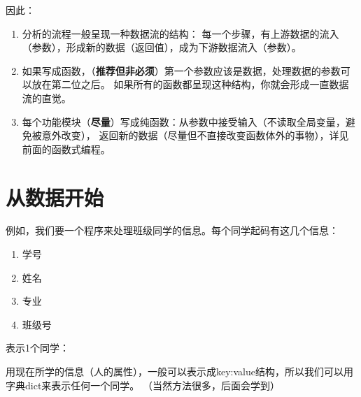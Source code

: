 \documentclass[
  letterpaper,
  DIV=11,
  numbers=noendperiod]{scrreprt}
\providecommand{\tightlist}{%
  \setlength{\itemsep}{0pt}\setlength{\parskip}{0pt}}\usepackage{longtable,booktabs,array}
\begin{document}
因此：

\begin{enumerate}
\def\labelenumi{\arabic{enumi}.}
\tightlist
\item
  分析的流程一般呈现一种数据流的结构：
  每一个步骤，有上游数据的流入（参数），形成新的数据（返回值），成为下游数据流入（参数）。
\item
  如果写成函数，（\textbf{推荐但非必须}）第一个参数应该是数据，处理数据的参数可以放在第二位之后。
  如果所有的函数都呈现这种结构，你就会形成一直数据流的直觉。
\item
  每个功能模块（\textbf{尽量}）写成纯函数：从参数中接受输入（不读取全局变量，避免被意外改变），
  返回新的数据（尽量但不直接改变函数体外的事物），详见前面的函数式编程。
\end{enumerate}

\hypertarget{ux4eceux6570ux636eux5f00ux59cb}{%
\section{从数据开始}\label{ux4eceux6570ux636eux5f00ux59cb}}

例如，我们要一个程序来处理班级同学的信息。每个同学起码有这几个信息：

\begin{enumerate}
\def\labelenumi{\arabic{enumi}.}
\tightlist
\item
  学号
\item
  姓名
\item
  专业
\item
  班级号
\end{enumerate}

表示1个同学：

用现在所学的信息（人的属性），一般可以表示成key:value结构，所以我们可以用字典dict来表示任何一个同学。
（当然方法很多，后面会学到）
\end{document}
